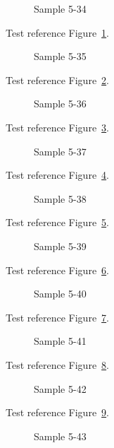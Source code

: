 \begin{figure}[tbhp]
\caption{Sample 5-34}
\label{fig:sample-5-34}
\end{figure}

Test reference Figure~\ref{fig:sample-5-34}.

\begin{figure}[tbhp]
\caption{Sample 5-35}
\label{fig:sample-5-35}
\end{figure}

Test reference Figure~\ref{fig:sample-5-35}.

\begin{figure}[tbhp]
\caption{Sample 5-36}
\label{fig:sample-5-36}
\end{figure}

Test reference Figure~\ref{fig:sample-5-36}.

\begin{figure}[tbhp]
\caption{Sample 5-37}
\label{fig:sample-5-37}
\end{figure}

Test reference Figure~\ref{fig:sample-5-37}.

\begin{figure}[tbhp]
\caption{Sample 5-38}
\label{fig:sample-5-38}
\end{figure}

Test reference Figure~\ref{fig:sample-5-38}.

\begin{figure}[tbhp]
\caption{Sample 5-39}
\label{fig:sample-5-39}
\end{figure}

Test reference Figure~\ref{fig:sample-5-39}.

\begin{figure}[tbhp]
\caption{Sample 5-40}
\label{fig:sample-5-40}
\end{figure}

Test reference Figure~\ref{fig:sample-5-40}.

\begin{figure}[tbhp]
\caption{Sample 5-41}
\label{fig:sample-5-41}
\end{figure}

Test reference Figure~\ref{fig:sample-5-41}.

\begin{figure}[tbhp]
\caption{Sample 5-42}
\label{fig:sample-5-42}
\end{figure}

Test reference Figure~\ref{fig:sample-5-42}.

\begin{figure}[tbhp]
\caption{Sample 5-43}
\label{fig:sample-5-43}
\end{figure}

